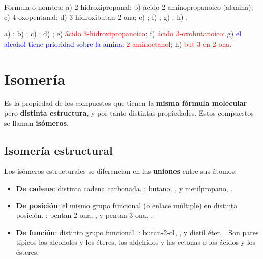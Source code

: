 \begin{exercise}
    Formula o nombra: a) 2-hidroxipropanal; b) ácido 2-aminopropanoico (alanina); c) 4-oxopentanal; d) 3-hidroxibutan-2-ona;
    e) ; f) ; g) ; h) .
    \begin{solu}
        a) \textcolor{red}{}; b) \textcolor{red}{}; c) \textcolor{red}{};
        d) \textcolor{red}{}; e) \textcolor{red}{ácido 3-hidroxipropanoico}; f) \textcolor{red}{ácido
        3-oxobutanoico}; g) \textcolor{blue}{el alcohol tiene prioridad sobre la amina:} \textcolor{red}{2-aminoetanol};
        h) \textcolor{red}{but-3-en-2-ona}.
    \end{solu}
\end{exercise}

\section{Isomería}\label{sec:ud7-isomeria}

\begin{definition}[Isomería]
    Es la propiedad de los compuestos que tienen la \textbf{misma fórmula molecular} pero \textbf{distinta estructura}, y por tanto
    distintas propiedades. Estos compuestos se llaman \textbf{isómeros}.
\end{definition}

\subsection{Isomería estructural}

Los isómeros estructurales se diferencian en las \textbf{uniones} entre sus átomos:
\begin{itemize}
    \item \textbf{De cadena}: distinta cadena carbonada. : butano, , y metilpropano,
    .
    \item \textbf{De posición}: el mismo grupo funcional (o enlace múltiple) en distinta posición. : pentan-2-ona,
    , y pentan-3-ona, .
    \item \textbf{De función}: distinto grupo funcional. : butan-2-ol, , y dietil éter,
    . Son pares típicos los alcoholes y los éteres, los aldehídos y las cetonas o los ácidos y los ésteres.
\end{itemize}

